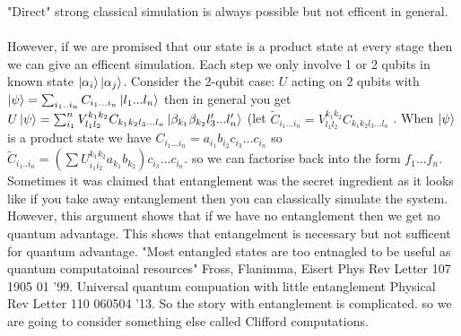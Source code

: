\documentclass{article}
\begin{document}
                        "Direct" strong classical simulation is always possible but not efficent in general. \\\\However, if we are promised that our state is a product state at every stage then we can give an efficent simulation. Each step we only involve 1 or 2 qubits in known state $\ket{\alpha_i} \ket{\alpha_j}$. Consider the 2-qubit case: $U$ acting on 2 qubits with $\ket{\psi} = \sum_{i_1..i_n} C_{i_1...i_n} \ket{l_1...l_n}$ then in general you get $U \ket{\psi} = \sum_{i_1}^n V^{k_1 k_2}_{l_1 l_2} C_{k_1 k_2 l_3...l_n} \ket{ \beta_{k_1} \beta_{k_2} l'_3... l'_n}$ (let $\tilde C_{i_1... i_n} =  V^{k_1 k_2}_{l_1 l_2} C_{k_1 k_2 l_3...l_n} $ . When $\ket{\psi}$ is a product state we have $C_{i_1 ... i_n} = a_{i_1} b_{i_2} c_{i_3} ... c_{i_n}$ so $\tilde C_{i_1 .. i_n} = ( \sum U_{i_1 i_2}^{k_1 k_2} a_{k_1} b_{k_2} ) c_{i_3} ... c_{i_n}$. so we can factorise back into the form $f_1... f_n$. Sometimes it was claimed that entanglement was the secret ingredient as it looks like if you take away entanglement then you can classically simulate the system. However, this argument shows that if we have no entanglement then we get no quantum advantage. This shows that entangelment is necessary but not sufficent for quantum advantage. "Most entangled states are too entnagled to be useful as quantum computatoinal resources" Fross, Flanimma, Eisert Phys Rev Letter 107 1905 01 '99. Universal quantum compuation with little entanglement Physical Rev Letter  110 060504 '13. So the story with entanglement is complicated. so we are going to consider something else called Clifford computations.
\end{document}
